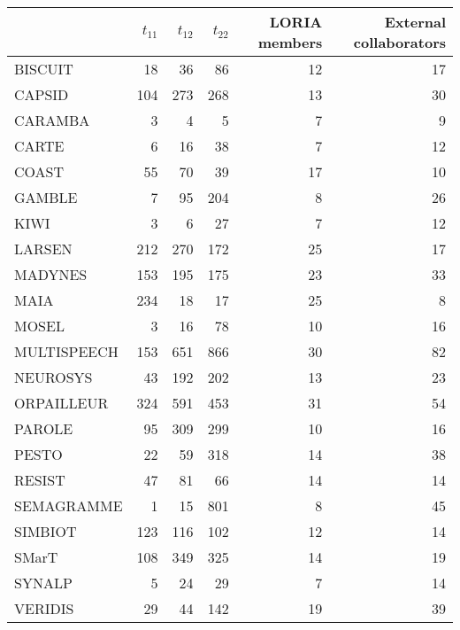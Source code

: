 \begin{tabular}{lrrrrr}
\toprule
{} &  $t_{11}$ &  $t_{12}$ &  $t_{22}$ &  LORIA members &  External collaborators \\
\midrule
BISCUIT     &        18 &        36 &        86 &             12 &                      17 \\
CAPSID      &       104 &       273 &       268 &             13 &                      30 \\
CARAMBA     &         3 &         4 &         5 &              7 &                       9 \\
CARTE       &         6 &        16 &        38 &              7 &                      12 \\
COAST       &        55 &        70 &        39 &             17 &                      10 \\
GAMBLE      &         7 &        95 &       204 &              8 &                      26 \\
KIWI        &         3 &         6 &        27 &              7 &                      12 \\
LARSEN      &       212 &       270 &       172 &             25 &                      17 \\
MADYNES     &       153 &       195 &       175 &             23 &                      33 \\
MAIA        &       234 &        18 &        17 &             25 &                       8 \\
MOSEL       &         3 &        16 &        78 &             10 &                      16 \\
MULTISPEECH &       153 &       651 &       866 &             30 &                      82 \\
NEUROSYS    &        43 &       192 &       202 &             13 &                      23 \\
ORPAILLEUR  &       324 &       591 &       453 &             31 &                      54 \\
PAROLE      &        95 &       309 &       299 &             10 &                      16 \\
PESTO       &        22 &        59 &       318 &             14 &                      38 \\
RESIST      &        47 &        81 &        66 &             14 &                      14 \\
SEMAGRAMME  &         1 &        15 &       801 &              8 &                      45 \\
SIMBIOT     &       123 &       116 &       102 &             12 &                      14 \\
SMarT       &       108 &       349 &       325 &             14 &                      19 \\
SYNALP      &         5 &        24 &        29 &              7 &                      14 \\
VERIDIS     &        29 &        44 &       142 &             19 &                      39 \\
\bottomrule
\end{tabular}
